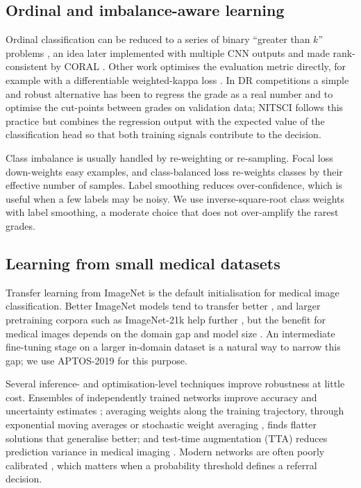 \subsection{Ordinal and imbalance-aware learning}
Ordinal classification can be reduced to a series of binary ``greater than $k$'' problems
\citep{frank2001simple}, an idea later implemented with multiple CNN outputs \citep{niu2016ordinal} and made
rank-consistent by CORAL \citep{cao2020rank}. Other work optimises the evaluation metric directly, for example with a
differentiable weighted-kappa loss \citep{delatorre2018weighted}. In DR competitions a simple and robust alternative
has been to regress the grade as a real number and to optimise the cut-points between grades on validation data;
NITSCI follows this practice but combines the regression output with the expected value of the classification head
so that both training signals contribute to the decision.

Class imbalance is usually handled by re-weighting or re-sampling. Focal loss \citep{lin2017focal} down-weights easy
examples, and class-balanced loss \citep{cui2019class} re-weights classes by their effective number of samples.
Label smoothing \citep{szegedy2016rethinking} reduces over-confidence, which is useful when a few labels may be noisy.
We use inverse-square-root class weights with label smoothing, a moderate choice that does not over-amplify the
rarest grades.

\subsection{Learning from small medical datasets}
Transfer learning from ImageNet \citep{deng2009imagenet} is the default initialisation for medical image
classification. Better ImageNet models tend to transfer better \citep{kornblith2019better}, and larger pretraining
corpora such as ImageNet-21k help further \citep{ridnik2021imagenet21k}, but the benefit for medical images depends on
the domain gap and model size \citep{raghu2019transfusion}. An intermediate fine-tuning stage on a larger in-domain
dataset is a natural way to narrow this gap; we use APTOS-2019 for this purpose.

Several inference- and optimisation-level techniques improve robustness at little cost. Ensembles of independently
trained networks improve accuracy and uncertainty estimates \citep{lakshminarayanan2017simple}; averaging weights
along the training trajectory, through exponential moving averages \citep{polyak1992acceleration} or stochastic
weight averaging \citep{izmailov2018averaging}, finds flatter solutions that generalise better; and test-time
augmentation (TTA) reduces prediction variance in medical imaging \citep{wang2019aleatoric}. Modern networks are
often poorly calibrated \citep{guo2017calibration}, which matters when a probability threshold defines a referral
decision.

